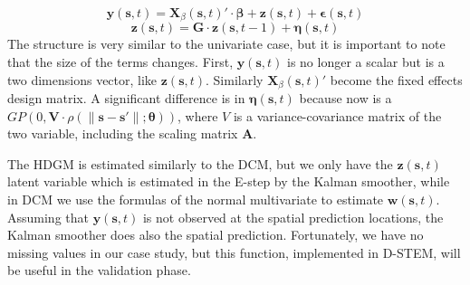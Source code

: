 \begin{displaymath}
	\boldsymbol{y}(\boldsymbol{s}, t) = \boldsymbol{X}_\beta(\boldsymbol{s}, t)' \cdot \boldsymbol{\beta} + \boldsymbol{z}(\boldsymbol{s}, t) + \boldsymbol{\epsilon}(\boldsymbol{s}, t)
\end{displaymath}
\begin{displaymath}
	\boldsymbol{z}(\boldsymbol{s}, t) = \boldsymbol{G} \cdot \boldsymbol{z}(\boldsymbol{s}, t-1) + \boldsymbol{\eta}(\boldsymbol{s}, t)
\end{displaymath}
The structure is very similar to the univariate case, but it is important to note that the size of the terms changes. First, $\boldsymbol{y}(\boldsymbol{s}, t)$ is no longer a scalar but is a two dimensions vector, like $\boldsymbol{z}(\boldsymbol{s}, t)$. Similarly $\boldsymbol{X}_\beta(\boldsymbol{s}, t)'$ become the fixed effects design matrix. A significant difference is in $\boldsymbol{\eta}(\boldsymbol{s},t)$ because now is a $GP(0,\boldsymbol{V} \cdot \rho(\lVert \boldsymbol{s}-\boldsymbol{s}' \rVert; \boldsymbol{\theta}))$, where $V$ is a variance-covariance matrix of the two variable, including the scaling matrix $\boldsymbol{A}$. \par The HDGM is estimated similarly to the DCM, but we only have the $\boldsymbol{z}(\boldsymbol{s},t)$ latent variable which is estimated in the E-step by the Kalman smoother, while in DCM we use the formulas of the normal multivariate to estimate $\boldsymbol{w}(\boldsymbol{s}, t)$. Assuming that $\boldsymbol{y}(\boldsymbol{s}, t)$ is not observed at the spatial prediction locations, the Kalman smoother does also the spatial prediction. Fortunately, we have no missing values in our case study, but this function, implemented in D-STEM, will be useful in the validation phase.